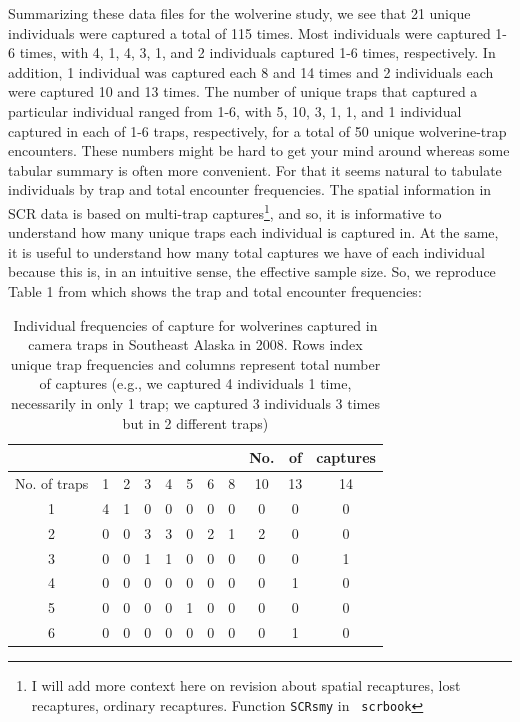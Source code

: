Summarizing these data files for the wolverine study, we see that 21
unique individuals were captured a total of 115 times. Most
individuals were captured 1-6 times, with 4, 1, 4, 3, 1, and 2
individuals captured 1-6 times, respectively.  In addition, 1
individual was captured each 8 and 14 times and 2 individuals each
were captured 10 and 13 times.  The number of unique traps that
captured a particular individual ranged from 1-6, with 5, 10, 3, 1, 1,
and 1 individual captured in each of 1-6 traps, respectively, for a
total of 50 unique wolverine-trap encounters.  These numbers might be
hard to get your mind around whereas some tabular summary is often
more convenient. For that it seems natural to tabulate individuals by
trap and total encounter frequencies. The spatial information in SCR
data is based on multi-trap captures\footnote{I will add more 
context here on revision about spatial recaptures, lost recaptures,
ordinary recaptures. Function \mbox{\tt SCRsmy} in \mbox{\tt
  scrbook}}, 
and so, it is informative to
understand how many unique traps each individual is captured in. At
the same, it is useful to understand how many total captures we have
of each individual because this is, in an intuitive sense, the
effective sample size.  So, we reproduce Table 1 from
\citet{royle_etal:2011jwm} which shows the trap and total encounter
frequencies:

\begin{table} [htp]
  \caption{Individual frequencies of capture for wolverines captured
    in camera traps in Southeast Alaska in 2008. Rows index unique
    trap frequencies and columns represent total number of captures
    (e.g., we captured 4 individuals 1 time, necessarily in only 1
    trap; we captured 3 individuals 3 times but in 2 different traps)}
\centering
\begin{tabular}{c c c c c c c c c c c}
\hline
 & & & & & & & &  No.&of&captures \\
\hline
No. of traps & 1 & 2 & 3 & 4 & 5 & 6 & 8 & 10 &13 &14 \\
\hline
1 & 4 & 1 & 0 & 0 & 0 & 0 & 0 & 0 & 0 & 0 \\
2 & 0 & 0 & 3 & 3 & 0 & 2 & 1 & 2 & 0 & 0 \\
3 & 0 & 0 & 1 & 1 & 0 & 0 & 0 & 0 & 0 & 1 \\
4 & 0 & 0 & 0 & 0 & 0 & 0 & 0 & 0 & 1 & 0 \\
5 & 0 & 0 & 0 & 0 & 1 & 0 & 0 & 0 & 0 & 0 \\
6 & 0 & 0 & 0 & 0 & 0 & 0 & 0 & 0 & 1 & 0 \\
\hline
\end{tabular}
\end{table}

